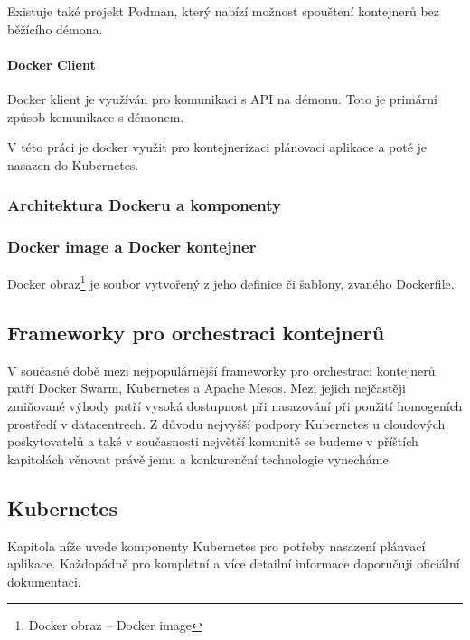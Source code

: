 \documentclass[thesis=M,czech]{FITthesis}[2019/12/23]
\theoremstyle{plain}
\theoremstyle{definition}
\begin{document}
Existuje také projekt Podman, který nabízí možnost spouštení kontejnerů bez běžícího démona. 

\paragraph{Docker Client}

Docker klient je využíván pro komunikaci s API na démonu. Toto je primární způsob komunikace s démonem.


V této práci je docker využit pro kontejnerizaci plánovací aplikace a poté je nasazen do Kubernetes.




\subsubsection{Architektura Dockeru a komponenty}


\subsubsection{Docker image a Docker kontejner}


Docker obraz\footnote{Docker obraz -- Docker image} je soubor vytvořený z jeho definice či šablony, zvaného Dockerfile.  

\subsection{Frameworky pro orchestraci kontejnerů}


V současné době mezi nejpopulárnější frameworky pro orchestraci kontejnerů patří Docker Swarm, Kubernetes a Apache Mesos. Mezi jejich nejčastěji zmiňované výhody patří vysoká dostupnost při nasazování při použití homogeních prostředí v datacentrech. Z důvodu nejvyšší podpory Kubernetes u cloudových poskytovatelů a také v současnosti největší komunitě se budeme v příštích kapitolách věnovat právě jemu a konkurenční technologie vynecháme.

\subsection{Kubernetes}

Kapitola níže uvede komponenty Kubernetes pro potřeby nasazení plánvací aplikace. Každopádně pro kompletní a více detailní informace doporučuji oficiální dokumentaci. 
\end{document}
